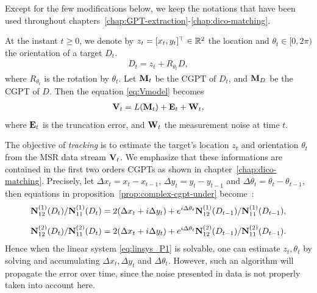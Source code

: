 Except for the few modifications below, we keep the notations that have been
used throughout chapters~\ref{chap:GPT-extraction}-\ref{chap:dico-matching}.


At the instant $t\geq 0$, we denote by $z_t=[x_t, y_t]^\top\in\R^2$ the location and
$\theta_t\in[0,2\pi)$ the orientation of a target $D_t$.
\begin{align}
  \label{eq:target_transrot_t}
  D_t=z_t+R_{\theta_t} D,
\end{align}
where $R_{\theta_t}$ is the rotation by $\theta_t$. Let $\mathbf{M}_t$ be
the CGPT of $D_t$, and $\mathbf{M}_D$ be the CGPT of $D$. Then the
equation \eqref{eq:Vmodel} becomes
\begin{align}
  \label{eq:MSR_CGPT_linsys_time}
  \mathbf{V}_t = L (\mathbf{M}_t) + \mathbf{E}_t + \mathbf{W}_t,
\end{align}
where $\mathbf{E}_t$ is the truncation error, and $\mathbf{W}_t$ the measurement noise at time $t$.

The objective of \emph{tracking} is to estimate the target's location $z_t$ and
orientation $\theta_t$ from the MSR data stream $\mathbf{V}_t$. We emphasize that these
informations are contained in the first two orders CGPTs as shown in 
chapter~\ref{chap:dico-matching}. Precisely, let $\Delta x_t=x_t-x_{t-1}$, $\Delta
y_t=y_t-y_{t-1}$ and $\Delta \theta_t=\theta_t-\theta_{t-1}$, then equations in
proposition~\ref{prop:complex-cgpt-under} become~:
\begin{equation}
  \label{eq:linsys_P1}
  \begin{aligned}
    \No_{12}(D_t)/\No_{11}(D_t) &= 2(\Delta x_t + i\Delta y_t) + e^{i\Delta\theta_t} \No_{12}(D_{t-1})/\No_{11}(D_{t-1}),\\
    \nm
    \Nt_{12}(D_t)/\Nt_{11}(D_t) &= 2(\Delta x_t + i\Delta y_t) + e^{i\Delta\theta_t} \Nt_{12}(D_{t-1})/\Nt_{11}(D_{t-1}).
  \end{aligned}
\end{equation}
Hence when the linear system \eqref{eq:linsys_P1} is solvable, one
can estimate $z_t, \theta_t$ by solving and accumulating $\Delta
x_t, \Delta y_t$ and $\Delta \theta_t$. However, such an algorithm
will propagate the error over time, since the noise presented in
data is not properly taken into account here.

